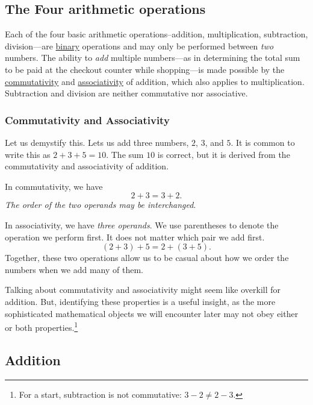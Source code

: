 \documentclass[
  a4paper,
]{article}
\begin{document}
\hypertarget{the-four-arithmetic-operations}{%
\subsection{The Four arithmetic
operations}\label{the-four-arithmetic-operations}}

Each of the four basic arithmetic operations--addition, multiplication,
subtraction, division---are
\href{https://en.wikipedia.org/w/index.php?title=Binary_operation\&oldid=1182322931}{binary}
operations and may only be performed between \emph{two} numbers. The
ability to \emph{add} multiple numbers---as in determining the total sum
to be paid at the checkout counter while shopping---is made possible by
the
\href{https://en.wikipedia.org/wiki/Commutative_property}{commutativity}
and
\href{https://en.wikipedia.org/wiki/Associative_property}{associativity}
of addition, which also applies to multiplication. Subtraction and
division are neither commutative nor associative.

\hypertarget{commutativity-and-associativity}{%
\subsubsection{Commutativity and
Associativity}\label{commutativity-and-associativity}}

Let us demystify this. Lets us add three numbers, \(2\), \(3\), and
\(5\). It is common to write this as \(2 + 3 + 5 = 10\). The sum \(10\)
is correct, but it is derived from the commutativity and associativity
of addition.

In commutativity, we have \[
2 + 3 = 3 + 2.
\] \emph{The order of the two operands may be interchanged}.

In associativity, we have \emph{three operands}. We use parentheses to
denote the operation we perform first. It does not matter which pair we
add first. \[
(2 + 3) + 5 = 2 + (3 + 5).
\] Together, these two operations allow us to be casual about how we
order the numbers when we add many of them.

Talking about commutativity and associativity might seem like overkill
for addition. But, identifying these properties is a useful insight, as
the more sophisticated mathematical objects we will encounter later may
not obey either or both properties.\footnote{For a start, subtraction is
  not commutative: \(3 - 2 \ne 2 - 3\).}

\hypertarget{addition}{%
\subsection{Addition}\label{addition}}
\end{document}
